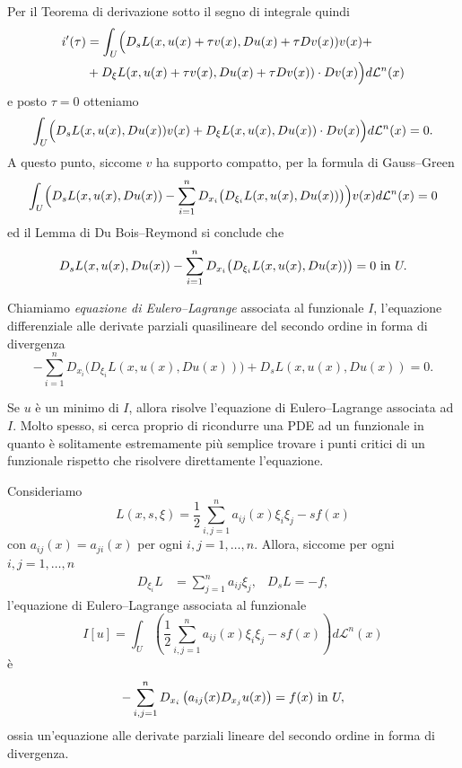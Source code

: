 Per il Teorema di derivazione sotto il segno di integrale quindi 
\begin{align*}
	i'(\tau) &=\int_U \Bigl( D_sL(x,u(x)+\tau v(x),Du(x)+\tau Dv(x))v(x) + \\
	& + D_{\xi}L(x,u(x)+\tau v(x),Du(x)+\tau Dv(x))\cdot Dv(x)\Bigr) d\mathcal{L}^n(x) 
\end{align*}
e posto $\tau = 0$ otteniamo 
\[ \int_U \Bigl( D_sL(x,u(x),Du(x))v(x) + D_{\xi}L(x,u(x),Du(x))\cdot Dv(x)\Bigr) d\mathcal{L}^n(x) = 0. \]
A questo punto, siccome $v$ ha supporto compatto, per la formula di Gauss--Green
\[ \int_U \Bigl( D_sL(x,u(x),Du(x)) -\sum_{i=1}^{n} D_{x_i}\bigl( D_{\xi_i}L(x,u(x),Du(x))\bigr) \Bigr)v(x) d\mathcal{L}^n(x) = 0 \]
ed il Lemma di Du Bois--Reymond si conclude che 
\[  D_sL(x,u(x),Du(x)) -\sum_{i=1}^{n} D_{x_i}\bigl( D_{\xi_i}L(x,u(x),Du(x))\bigr) = 0 \textup{ in } U. \]
\begin{definizione}
	Chiamiamo \emph{equazione di Eulero--Lagrange} associata al funzionale $I$, l'equazione differenziale alle derivate parziali quasilineare del secondo ordine in forma di divergenza
	\[ -\sum_{i=1}^{n} D_{x_i}\bigl( D_{\xi_i}L(x,u(x),Du(x))\bigr)  + D_sL(x,u(x),Du(x)) = 0. \]
\end{definizione}
Se $u$ è un minimo di $I$, allora risolve l'equazione di Eulero--Lagrange associata ad $I$. Molto spesso, si cerca proprio di ricondurre una PDE ad un funzionale in quanto è solitamente estremamente più semplice trovare i punti critici di un funzionale rispetto che risolvere direttamente l'equazione.
\begin{esempio}
	Consideriamo
	\[ L(x,s,\xi) = \frac{1}{2}\sum_{i,j=1}^{n}a_{ij}(x)\xi_i\xi_j - sf(x) \]
	con $a_{ij}(x) = a_{ji}(x)$ per ogni $i,j=1,\dots,n$. Allora, siccome per ogni $i,j=1,\dots,n$
	\begin{align*}
		D_{\xi_i} L &= \sum_{j=1}^n a_{ij}\xi_j, & D_s L = -f,
	\end{align*}
	l'equazione di Eulero--Lagrange associata al funzionale 
	\[ I[u] = \int_U  \left( \frac{1}{2}\sum_{i,j=1}^{n}a_{ij}(x)\xi_i\xi_j - sf(x)\right) d\mathcal{L}^n(x)\]
	è 
	\[ -\sum_{i,j=1}^n D_{x_i}\left( a_{ij}(x)D_{x_j}u(x)\right)  = f(x) \textup{ in } U, \]
	ossia un'equazione alle derivate parziali lineare del secondo ordine in forma di divergenza.
\end{esempio}

